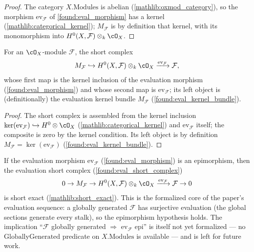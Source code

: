 \begin{proof}
  \leanok
  The category \(X.\mathrm{Modules}\) is abelian (\cref{mathlib:oxmod_category}), so
  the morphism \(\mathrm{ev}_{\mathcal F}\) of \cref{found:eval_morphism} has a kernel
  (\cref{mathlib:categorical_kernel}); \(M_{\mathcal F}\) is by definition that kernel,
  with its monomorphism into \(H^0(X,\mathcal F)\otimes_k\cO_X\).
\end{proof}

\begin{definition}
  \label{found:eval_short_complex}
  For an \(\cO_X\)-module \(\mathcal F\), the short complex
  \[
    M_{\mathcal F}\hookrightarrow H^0(X,\mathcal F)\otimes_k\cO_X
       \xrightarrow{\mathrm{ev}_{\mathcal F}}\mathcal F ,
  \]
  whose first map is the kernel inclusion of the evaluation morphism
  (\cref{found:eval_morphism}) and whose second map is \(\mathrm{ev}_{\mathcal F}\); its
  left object is (definitionally) the evaluation kernel bundle \(M_{\mathcal F}\)
  (\cref{found:eval_kernel_bundle}).
\end{definition}

\begin{proof}
  \leanok
  The short complex is assembled from the kernel inclusion
  \(\ker(\mathrm{ev}_{\mathcal F})\hookrightarrow H^0\otimes\cO_X\)
  (\cref{mathlib:categorical_kernel}) and \(\mathrm{ev}_{\mathcal F}\) itself; the
  composite is zero by the kernel condition.  Its left object is by definition
  \(M_{\mathcal F}=\ker(\mathrm{ev}_{\mathcal F})\) (\cref{found:eval_kernel_bundle}).
\end{proof}

\begin{lemma}
  \label{found:eval_shortexact_of_globally_generated}
  If the evaluation morphism \(\mathrm{ev}_{\mathcal F}\) (\cref{found:eval_morphism}) is
  an epimorphism, then the evaluation short complex (\cref{found:eval_short_complex})
  \[
    0\to M_{\mathcal F}\to H^0(X,\mathcal F)\otimes_k\cO_X
       \xrightarrow{\mathrm{ev}_{\mathcal F}}\mathcal F\to 0
  \]
  is short exact (\cref{mathlib:short_exact}).  This is the formalized core of the
  paper's evaluation sequence: a globally generated \(\mathcal F\) has surjective
  evaluation (the global sections generate every stalk), so the epimorphism hypothesis
  holds.  The implication ``\(\mathcal F\) globally generated \(\Rightarrow\)
  \(\mathrm{ev}_{\mathcal F}\) epi'' is itself not yet formalized --- no
  \(\mathrm{GloballyGenerated}\) predicate on \(X.\mathrm{Modules}\) is available ---
  and is left for future work.
\end{lemma}

